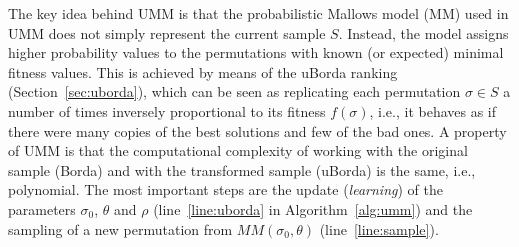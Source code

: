 \documentclass[runningheads]{llncs}
\begin{document}
The key idea behind UMM is that the probabilistic Mallows model (MM) used in
UMM does not simply represent the current sample $S$. Instead, the model
assigns higher probability values to the permutations with known (or expected)
minimal fitness values. This is achieved by means of the uBorda ranking
(Section~\ref{sec:uborda}), which can be seen as replicating each permutation
$\sigma \in S$ a number of times inversely proportional to its fitness
$f(\sigma)$, i.e., it behaves as if there were many copies of the best
solutions and few of the bad ones. A property of UMM is that the
computational complexity of working with the original sample (Borda) and with the
transformed sample (uBorda) is the same, i.e., polynomial. The most important steps are the update
(\emph{learning}) of the parameters $\sigma_0$, $\theta$ and $\rho$ (line~\ref{line:uborda} in Algorithm~\ref{alg:umm}) and
the sampling of a new permutation from $MM(\sigma_0,\theta)$ (line~\ref{line:sample}). %






\newcommand{\Edist}{\ensuremath{\mathbb{E}[D]}}
\end{document}
